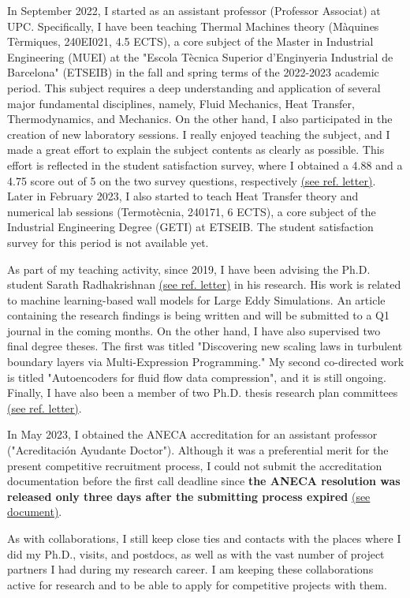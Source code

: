\documentclass{article}
\begin{document}
In September 2022, I started as an assistant professor (Professor Associat) at UPC. Specifically, I have been teaching Thermal Machines theory (Màquines Tèrmiques, 240EI021, 4.5 ECTS), a core subject of the Master in Industrial Engineering (MUEI) at the "Escola Tècnica Superior d'Enginyeria Industrial de Barcelona" (ETSEIB) in the fall and spring terms of the 2022-2023 academic period. This subject requires a deep understanding and application of several major fundamental disciplines, namely, Fluid Mechanics, Heat Transfer, Thermodynamics, and Mechanics. On the other hand, I also participated in the creation of new laboratory sessions.
I really enjoyed teaching the subject, and I made a great effort to explain the subject contents as clearly as possible. This effort is reflected in the student satisfaction survey, where I obtained a 4.88 and a 4.75 score out of 5 on the two survey questions, respectively \hyperlink{enquestes.1}{(see ref. letter)}. 
Later in February 2023, I also started to teach Heat Transfer theory and numerical lab sessions (Termotècnia, 240171, 6 ECTS), a core subject of the Industrial Engineering Degree (GETI) at ETSEIB. The student satisfaction survey for this period is not available yet. 

As part of my teaching activity, since 2019, I have been advising the Ph.D. student Sarath Radhakrishnan \hyperlink{tesis.1}{(see ref. letter)} in his research. His work is related to machine learning-based wall models for Large Eddy Simulations. An article containing the research findings is being written and will be submitted to a Q1 journal in the coming months.  On the other hand, I have also supervised two final degree theses. The first was titled "Discovering new scaling laws in turbulent boundary layers via Multi-Expression Programming." My second co-directed work is titled "Autoencoders for fluid flow data compression", and it is still ongoing. Finally, I have also been a member of two Ph.D. thesis research plan committees \hyperlink{tribunals.1}{(see ref. letter)}.

In May 2023, I obtained the ANECA accreditation for an assistant professor ("Acreditación Ayudante Doctor"). Although it was a preferential merit for the present competitive recruitment process, I could not submit the accreditation documentation before the first call deadline since {\bf the ANECA resolution was released only three days after the submitting process expired} \hyperlink{acreditacio.1}{(see document)}.

As with collaborations, I still keep close ties and contacts with the places where I did my Ph.D., visits, and postdocs, as well as with the vast number of project partners I had during my research career. I am keeping these collaborations active for research and to be able to apply for competitive projects with them.  
\end{document}
